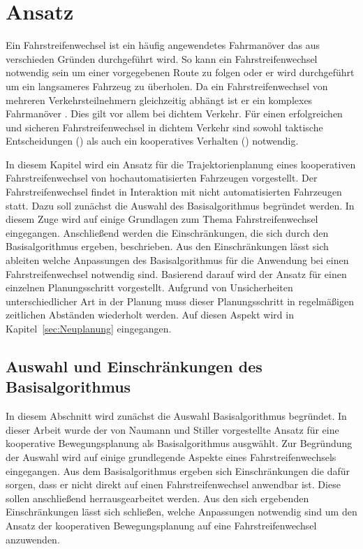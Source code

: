 
\chapter{Ansatz}
\label{sec:concepts}
Ein Fahrstreifenwechsel ist ein h\"aufig angewendetes Fahrman\"over das aus verschieden Gr\"unden durchgef\"uhrt wird.
So kann ein Fahrstreifenwechsel notwendig sein um einer vorgegebenen Route zu folgen oder er wird durchgef\"uhrt um ein langsameres Fahrzeug zu \"uberholen.
Da ein Fahrstreifenwechsel von mehreren Verkehrsteilnehmern gleichzeitig abh\"angt ist er ein komplexes Fahrman\"over \cite{Gipps1986}.
Dies gilt vor allem bei dichtem Verkehr.
F\"ur einen erfolgreichen und sicheren Fahrstreifenwechsel in dichtem Verkehr sind sowohl taktische Entscheidungen (\cite{Ulbrich2015towards}) als auch ein kooperatives Verhalten (\cite{Wei2013}) notwendig.

In diesem Kapitel wird ein Ansatz f\"ur die Trajektorienplanung eines kooperativen Fahrstreifenwechsel von hochautomatisierten Fahrzeugen vorgestellt.
Der Fahrstreifenwechsel findet in Interaktion mit nicht automatisierten Fahrzeugen statt.
Dazu soll zun\"achst die Auswahl des Basisalgorithmus begr\"undet werden.
In diesem Zuge wird auf einige Grundlagen zum Thema Fahrstreifenwechsel eingegangen.
Anschlie{\ss}end werden die Einschr\"ankungen, die sich durch den Basisalgorithmus ergeben, beschrieben.
Aus den Einschr\"ankungen l\"asst sich ableiten welche Anpassungen des Basisalgorithmus f\"ur die Anwendung bei einen Fahrstreifenwechsel notwendig sind.
Basierend darauf wird der Ansatz f\"ur einen einzelnen Planungsschritt vorgestellt.
Aufgrund von Unsicherheiten unterschiedlicher Art in der Planung muss dieser Planungsschritt in regelm\"a{\ss}igen zeitlichen Abst\"anden wiederholt werden.
Auf diesen Aspekt wird in Kapitel~\ref{sec:Neuplanung} eingegangen.

\section{Auswahl und Einschr\"ankungen des Basisalgorithmus}
In diesem Abschnitt wird zun\"achst die Auswahl Basisalgorithmus begr\"undet.
In dieser Arbeit wurde der von Naumann und Stiller \cite{Naumann2017towards} vorgestellte Ansatz f\"ur eine kooperative Bewegungsplanung als Basisalgorithmus ausgw\"ahlt. 
Zur Begr\"undung der Auswahl wird auf einige grundlegende Aspekte eines Fahrstreifenwechsels eingegangen.
Aus dem Basisalgorithmus ergeben sich Einschr\"ankungen die daf\"ur sorgen, dass er nicht direkt auf einen Fahrstreifenwechsel anwendbar ist.
Diese sollen anschlie{\ss}end herrausgearbeitet werden.
Aus den sich ergebenden Einschr\"ankungen l\"asst sich schlie{\ss}en, welche Anpassungen notwendig sind um den Ansatz der kooperativen Bewegungsplanung auf eine Fahrstreifenwechsel anzuwenden. 


